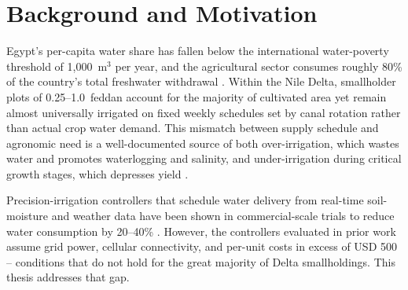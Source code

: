 \section{Background and Motivation}
Egypt's per-capita water share has fallen below the international water-poverty threshold of
1{,}000~m$^3$ per year, and the agricultural sector consumes roughly 80\% of the country's
total freshwater withdrawal \cite{elbaz2023}. Within the Nile Delta, smallholder plots of
0.25--1.0~feddan account for the majority of cultivated area yet remain almost universally
irrigated on fixed weekly schedules set by canal rotation rather than actual crop water
demand. This mismatch between supply schedule and agronomic need is a well-documented source
of both over-irrigation, which wastes water and promotes waterlogging and salinity, and
under-irrigation during critical growth stages, which depresses yield \cite{hassanein2021}.

Precision-irrigation controllers that schedule water delivery from real-time soil-moisture
and weather data have been shown in commercial-scale trials to reduce water consumption by
20--40\% \cite{fardous2022}. However, the controllers evaluated in prior work assume
grid power, cellular connectivity, and per-unit costs in excess of USD 500 -- conditions that
do not hold for the great majority of Delta smallholdings. This thesis addresses that gap.
